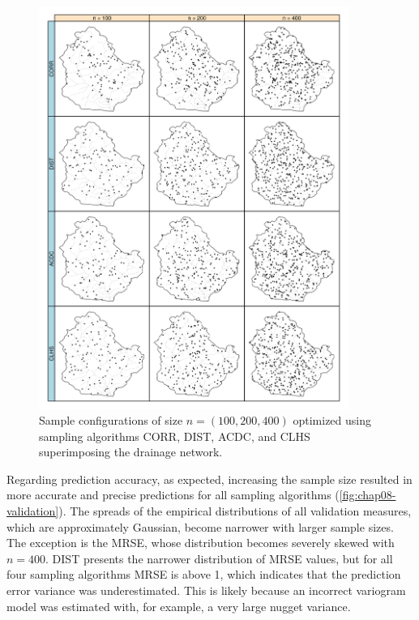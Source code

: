 \begin{figure}[!ht]
 \centering
 \includegraphics[width=0.90\textwidth]{fig/chap08-points-corr-dist-acdc-clhs}
 \caption[Sample configurations optimized using four sampling algorithms.]{Sample configurations of size 
 $n = (100, 200, 400)$ optimized using sampling algorithms CORR, DIST,  ACDC, and CLHS superimposing the
 drainage network.}
 \label{fig:chap08-points}
\end{figure}

Regarding prediction accuracy, as expected, increasing the sample size resulted in more accurate and precise 
predictions for all sampling algorithms (\autoref{fig:chap08-validation}). The spreads of the empirical 
distributions of all validation measures, which are approximately Gaussian, become narrower with larger sample 
sizes. The exception is the MRSE, whose distribution becomes severely skewed with $n = 400$. DIST presents the 
narrower distribution of MRSE values, but for all four sampling algorithms MRSE is above 1, which indicates 
that the prediction error variance was underestimated. This is likely because an incorrect variogram model was 
estimated with, for example, a very large nugget variance.

